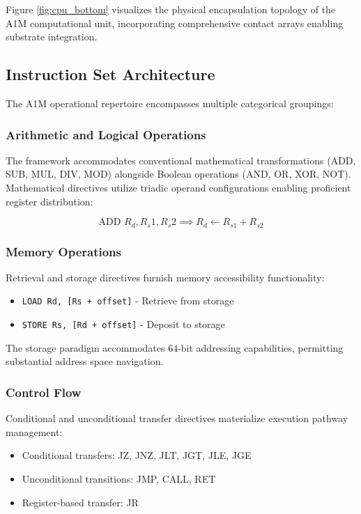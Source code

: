 \documentclass[conference,10pt,twocolumn]{IEEEtran}
\begin{document}
Figure \ref{fig:cpu_bottom} visualizes the physical encapsulation topology of the A1M computational unit, incorporating comprehensive contact arrays enabling substrate integration.

\subsection{Instruction Set Architecture}

The A1M operational repertoire encompasses multiple categorical groupings:

\subsubsection{Arithmetic and Logical Operations}
The framework accommodates conventional mathematical transformations (ADD, SUB, MUL, DIV, MOD) alongside Boolean operations (AND, OR, XOR, NOT). Mathematical directives utilize triadic operand configurations enabling proficient register distribution:

\begin{equation}
\text{ADD } R_d, R_s1, R_s2 \implies R_d \leftarrow R_{s1} + R_{s2}
\end{equation}

\subsubsection{Memory Operations}
Retrieval and storage directives furnish memory accessibility functionality:

\begin{itemize}
\item \texttt{LOAD Rd, [Rs + offset]} - Retrieve from storage
\item \texttt{STORE Rs, [Rd + offset]} - Deposit to storage
\end{itemize}

The storage paradigm accommodates 64-bit addressing capabilities, permitting substantial address space navigation.

\subsubsection{Control Flow}
Conditional and unconditional transfer directives materialize execution pathway management:

\begin{itemize}
\item Conditional transfers: JZ, JNZ, JLT, JGT, JLE, JGE
\item Unconditional transitions: JMP, CALL, RET
\item Register-based transfer: JR
\end{itemize}
\end{document}

